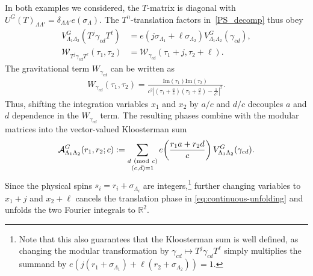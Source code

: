 \documentclass[11pt]{article}
\numberwithin{equation}{section}
\begin{document}
In both examples we considered, the $T$-matrix is diagonal with $U^G(T)_{\Lambda\Lambda'}=\delta_{\Lambda\Lambda'}e(\sigma_\Lambda)$. The $T^n$-translation factors in~\eqref{PS_decomp} thus obey
\begin{equation}
\begin{aligned}
 V^G_{\Lambda_1\Lambda_2}(T^j\gamma_{cd}T^\ell)
 &=e(j\sigma_{\Lambda_1}+\ell\sigma_{\Lambda_2})
   V^G_{\Lambda_1\Lambda_2}(\gamma_{cd}),\\
 \mathcal W_{T^j\gamma_{cd}T^\ell}(\tau_1,\tau_2)
 &=\mathcal W_{\gamma_{cd}}(\tau_1+j,\tau_2+\ell).
\end{aligned}
\label{eq:continuous-unfolding}
\end{equation}
The gravitational term $ W_{\gamma_{cd}}$ can be written as
\begin{align}
W_{\gamma_{cd}}(\tau_1,\tau_2)=   \frac{\mathrm{Im}(\tau_1) \mathrm{Im}(\tau_2)}{c^2\left|(\tau_1+\frac{a}{c})(\tau_2+\frac{d}{c})-\frac{1}{c^2}\right|^2}. 
\end{align}
Thus, shifting the integration variables $x_1$ and $x_2$ by $a/c$ and $d/c$ decouples $a$ and $d$ dependence in the $ W_{\gamma_{cd}}$ term. The resulting phases combine with the modular matrices into the vector-valued Kloosterman sum
\begin{equation}
\mathcal A^G_{\Lambda_1\Lambda_2}(r_1,r_2;c)
 :=\sum_{\substack{d\ ({\rm mod}\ c)\\(c,d)=1}}
 e\!\left(\frac{r_1a+r_2d}{c}\right)
 V^G_{\Lambda_1\Lambda_2}(\gamma_{cd}).
\label{Kloost_U(1)}
\end{equation}
Since the physical spins $s_i=r_i+\sigma_{\Lambda_i}$ are integers,\footnote{ Note that this also guarantees that the Kloosterman sum is well defined, as changing the modular transformation by $\gamma_{cd}\mapsto T^j\gamma_{cd}T^\ell$ simply multiplies the summand by $e(j(r_1+\sigma_{\Lambda_1})+\ell(r_2+\sigma_{\Lambda_2}))=1$.} further changing variables to $x_1+j$ and $x_2+\ell$ cancels the translation phase in \eqref{eq:continuous-unfolding} and unfolds the two Fourier integrals to $\mathbb{R}^2$.
\end{document}
